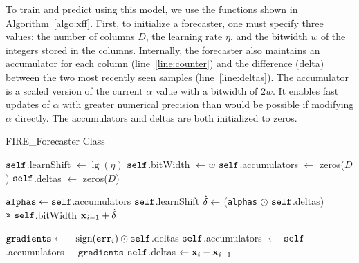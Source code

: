 To train and predict using this model, we use the functions shown in Algorithm~\ref{algo:xff}. First, to initialize a \fire forecaster, one must specify three values: the number of columns $D$, the learning rate $\eta$, and the bitwidth $w$ of the integers stored in the columns. Internally, the forecaster also maintains an accumulator for each column (line~\ref{line:counter}) and the difference (delta) between the two most recently seen samples (line~\ref{line:deltas}). The accumulator is a scaled version of the current $\alpha$ value with a bitwidth of $2w$. It enables fast updates of $\alpha$ with greater numerical precision than would be possible if modifying $\alpha$ directly. The accumulators and deltas are both initialized to zeros. %


\begin{algorithm}[h]
\caption{FIRE\_Forecaster Class} \label{algo:xff}
\begin{algorithmic}[1]

 \label{line:xffCtor}
\State $\texttt{self}$.learnShift $\leftarrow \lg(\eta)$
\State $\texttt{self}$.bitWidth $\leftarrow w$ 
\State $\texttt{self}$.accumulators $\leftarrow $ zeros($D$) \label{line:counter}
\State $\texttt{self}$.deltas $\leftarrow $ zeros($D$) \label{line:deltas}
\EndFunction

 \label{line:xffPredict}
\State $\texttt{alphas} \leftarrow \texttt{self}$.accumulators \rshift $\texttt{self}$.learnShift
\State $\hat{\mathbf{\delta}} \leftarrow$ (\texttt{alphas} $\odot$ $\texttt{self}$.deltas) $\texttt{>>}\text{ } \texttt{self}$.bitWidth
\RETURN $\mathbf{x}_{i-1} + \hat{\mathbf{\delta}}$
\EndFunction

 \label{line:xffTrain}
\State $\texttt{gradients} \leftarrow {-\operatorname{sign}(\texttt{err}_i)} \odot \texttt{self}$.deltas
\State $\texttt{self}$.accumulators $\leftarrow$ $\texttt{self}$.accumulators $-$ $\texttt{gradients}$
\State $\texttt{self}$.deltas $\leftarrow \mathbf{x}_{i} - \mathbf{x}_{i-1}$
\EndFunction

\end{algorithmic}
\end{algorithm}


